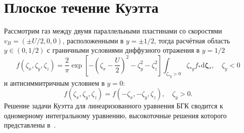 \documentclass{article}
\theoremstyle{plain}
\newcommand{\dd}{\mathrm{d}}
\newcommand{\dzeta}{\boldsymbol{\dd\zeta}}
\begin{document}
\section{Плоское течение Куэтта}

Рассмотрим газ между двумя параллельными пластинами со скоростями \(v_B = (\pm{U}/2,0,0)\),
расположенными в \(y=\pm1/2\), тогда расчётная область \(y\in(0,1/2)\) с граничными условиями
диффузного отражения в \(y=1/2\)
\begin{equation}\label{eq:diffuse}
    f(\zeta_x,\zeta_y,\zeta_z) = \frac2{\pi} \exp\left[-\left(\zeta_x-\frac{U}{2}\right)^2-\zeta_y^2-\zeta_z^2\right]
        \int_{\zeta_{*y}>0}\zeta_{*y} f_* \dzeta_*, \quad \zeta_y<0
\end{equation}
и антисиммитричным условием в \(y=0\):
\begin{equation}\label{eq:antisymmetry}
    f(\zeta_x,\zeta_y,\zeta_z) = f(-\zeta_x,-\zeta_y,\zeta_z), \quad \zeta_y>0.
\end{equation}
Решение задачи Куэтта для линеаризованного уравнения БГК сводится к одномерному интегральному уравнению,
высокоточные решения которого представлены в~\cite{Luo2015, Luo2016}.

\printbibliography
\end{document}

